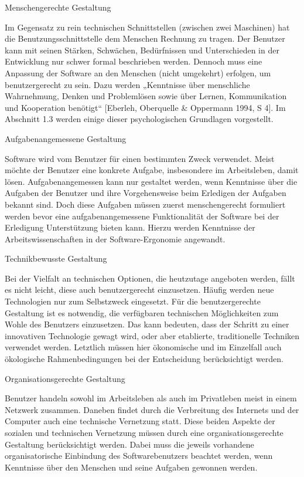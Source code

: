 \documentclass[a4paper, 12pt, twoside, BCOR=20mm, DIV=calc, abstracton, parskip=half*, toc=bibliography, toc=listof, headsepline, footsepline, headings=small, numbers=enddot]{scrreprt}
\begin{document}
	Menschengerechte Gestaltung
	
	Im Gegensatz zu rein technischen Schnittstellen (zwischen zwei Maschinen) hat die Benutzungsschnittstelle dem Menschen Rechnung zu tragen. Der Benutzer kann mit seinen Stärken, Schwächen, Bedürfnissen und Unterschieden in der Entwicklung nur schwer formal beschrieben werden. Dennoch muss eine Anpassung der Software an den Menschen (nicht umgekehrt) erfolgen, um benutzergerecht zu sein. Dazu werden „Kenntnisse über menschliche Wahrnehmung, Denken und Problemlösen sowie über Lernen, Kommunikation und Kooperation benötigt“ [Eberleh, Oberquelle \& Oppermann 1994, S 4]. Im Abschnitt 1.3 werden einige dieser psychologischen Grundlagen vorgestellt.
	
	Aufgabenangemessene Gestaltung
	
	Software wird vom Benutzer für einen bestimmten Zweck verwendet. Meist möchte der Benutzer eine konkrete Aufgabe, insbesondere im Arbeitsleben, damit lösen. Aufgabenangemessen kann nur gestaltet werden, wenn Kenntnisse über die Aufgaben der Benutzer und ihre Vorgehensweise beim Erledigen der Aufgaben bekannt sind. Doch diese Aufgaben müssen zuerst menschengerecht formuliert werden bevor eine aufgabenangemessene Funktionalität der Software bei der Erledigung Unterstützung bieten kann. Hierzu werden Kenntnisse der Arbeitswissenschaften in der Software-Ergonomie angewandt.
	
	Technikbewusste Gestaltung
	
	Bei der Vielfalt an technischen Optionen, die heutzutage angeboten werden, fällt es nicht leicht, diese auch benutzergerecht einzusetzen. Häufig werden neue Technologien nur zum Selbstzweck eingesetzt. Für die benutzergerechte Gestaltung ist es notwendig, die verfügbaren technischen Möglichkeiten zum Wohle des Benutzers einzusetzen. Das kann bedeuten, dass der Schritt zu einer innovativen Technologie gewagt wird, oder aber etablierte, traditionelle Techniken verwendet werden. Letztlich müssen hier ökonomische und im Einzelfall auch ökologische Rahmenbedingungen bei der Entscheidung berücksichtigt werden.
	
	Organisationsgerechte Gestaltung
	
	Benutzer handeln sowohl im Arbeitsleben als auch im Privatleben meist in einem Netzwerk zusammen. Daneben findet durch die Verbreitung des Internets und der Computer auch eine technische Vernetzung statt. Diese beiden Aspekte der sozialen und technischen Vernetzung müssen durch eine organisationsgerechte Gestaltung berücksichtigt werden. Dabei muss die jeweils vorhandene organisatorische Einbindung des Softwarebenutzers beachtet werden, wenn Kenntnisse über den Menschen und seine Aufgaben gewonnen werden.
	
\end{document}

